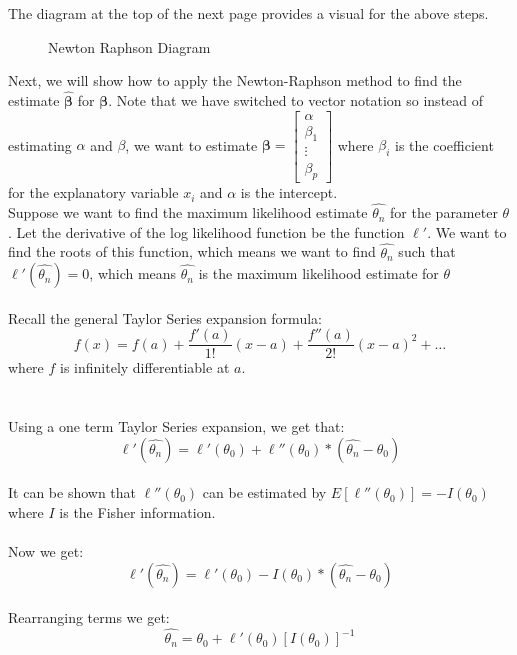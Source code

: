 \documentclass{article}
\begin{document}
\noindent The diagram at the top of the next page provides a visual for the above steps.\\

\begin{figure}[hbtp]
        \centering
        \caption{Newton Raphson Diagram}
        \label{Newton Raphson}
    \end{figure}

\noindent Next, we will show how to apply the Newton-Raphson method to find the estimate  $\boldsymbol{\hat{\beta}}$ for $\boldsymbol{\beta}$. Note that we have switched to vector notation so instead of estimating $\alpha$ and $\beta$, we want to estimate $\boldsymbol{\beta} = 
\begin{bmatrix} 
    \alpha \\
    \beta_1 \\
    \vdots \\
    \beta_p
\end{bmatrix}$ where $\beta_i$ is the coefficient for the explanatory variable $x_i$ and $\alpha$ is the intercept. \\



\noindent Suppose we want to find the maximum likelihood estimate $\hat{\theta_n}$ for the parameter $\theta$. Let the derivative of the log likelihood function be the function $\ell'$. We want to find the roots of this function, which means we want to find $\hat{\theta_n}$ such that $\ell'(\hat{\theta_n}) = 0$, which means $\hat{\theta_n}$ is the maximum likelihood estimate for $\theta$
\\\\
Recall the general Taylor Series expansion formula:
$$
f(x) = f(a) + \dfrac{f'(a)}{1!}(x - a) + \dfrac{f''(a)}{2!}(x-a)^2 + \ldots
$$
where $f$ is infinitely differentiable at $a$.
\\\\\\
Using a one term Taylor Series expansion, we get that:
$$
\ell'(\hat{\theta_n}) = \ell'(\theta_0) + \ell''(\theta_0)*(\hat{\theta_n} - \theta_0)
$$
\\
It can be shown that $\ell''(\theta_0)$ can be estimated by $E[\ell''(\theta_0)] = -I(\theta_0)$ where $I$ is the Fisher information. \\\\

Now we get:
$$
\ell'(\hat{\theta_n}) = \ell'(\theta_0) - I(\theta_0)*(\hat{\theta_n} - \theta_0)
$$
\\
Rearranging terms we get:
$$
\hat{\theta_n} = \theta_0 + \ell'(\theta_0)[I(\theta_0)]^{-1}
$$
\end{document}
